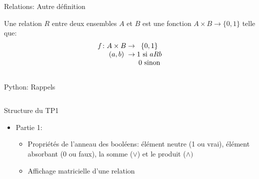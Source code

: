 \documentclass[11pt]{beamer}
\newcommand\myfunc[5]{%
  \begingroup
  \setlength\arraycolsep{0pt}
  #1\colon\begin{array}[t]{c >{{}}c<{{}} c}
             #2 & \to & #3 \\ #4 & \to & #5 
          \end{array}%
  \endgroup}
\begin{document}
\begin{frame}{Relations: Autre définition}
\begin{definition}[Relation]
Une relation $R$ entre deux ensembles $A$ et $B$ est une fonction $A \times B \rightarrow \{0,1\}$ telle que:
\begin{equation*}
\myfunc{f}{A \times B}{\{0,1\}}{(a,b)}{1 \textnormal{ si } aRb \textnormal{} \\ & & 0 \textnormal{ sinon}}
\end{equation*}
\end{definition}
\begin{columns}
\end{columns}
\end{frame}

\begin{frame}{Python: Rappels}
\begin{block}{}
\scriptsize
\inputminted{python}{src_python/tp1_cours.py}
\end{block}
\end{frame}

\begin{frame}{Structure du TP1}
\begin{itemize}
\item Partie 1: 
\begin{itemize}
\item Propriétés de l'anneau des booléens: élément neutre (1 ou vrai), élément absorbant (0 ou faux), la somme ($\vee$) et le produit ($\wedge)$
\item Affichage matricielle d'une relation 
\end{itemize}
\end{itemize}
\end{frame}
\end{document}
